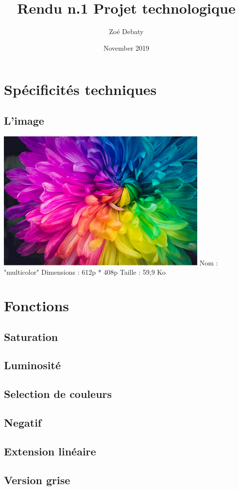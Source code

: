 \documentclass{article}
\title{Rendu n.1 Projet technologique}
\author{Zoé Debaty}
\date{November 2019}
\begin{document}
\maketitle
\tableofcontents 
\section{Spécificités techniques}
\subsection{L'image}
\includegraphics{multicolor}
Nom : "multicolor" 
Dimensions : 612p * 408p
Taille : 59,9 Ko
\section{Fonctions}
\subsection{Saturation}
\subsection{Luminosité}
\subsection{Selection de couleurs}
\subsection{Negatif}
\subsection{Extension linéaire}
\subsection{Version grise}
\end{document}
